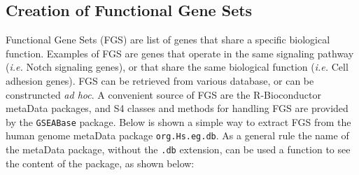 \documentclass[11pt]{article}
\newcommand{\Rpackage}[1]{{\texttt{#1}}}
\begin{document}
\subsection{Creation of Functional Gene Sets}
Functional Gene Sets (FGS) are list of genes that share a specific biological function.
Examples of FGS are genes that operate in the same signaling pathway 
({\it i.e.} Notch signaling genes), or that share the same biological function
({\it i.e.} Cell adhesion genes).
FGS can be retrieved from various database, or can be construncted {\it ad hoc}.
A convenient source of FGS are the R-Bioconductor metaData packages,
and S4 classes and methods for handling FGS are provided by the \Rpackage{GSEABase}
package. Below is shown a simple way to extract FGS from the human genome
metaData package \Rpackage{org.Hs.eg.db}.
As a general rule the name of the metaData package, without the \texttt{.db} extension,
can be used a function to see the content of the package, as shown below:
\end{document}
